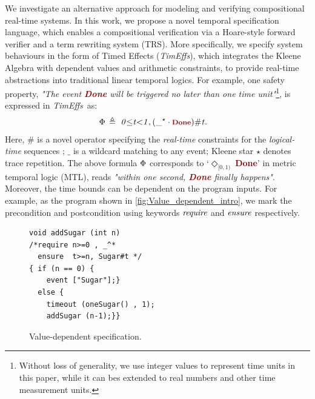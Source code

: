 \documentclass[acmsmall,10pt,review]{acmart}
\newcommand{\timedEffects}{\emph{TimEffs}}
\newcommand{\effect}{\textcolor{black}{\ensuremath{\mathrm{\Phi}}}}
\newcommand{\anyevent}[1]{{\textcolor{darkred}
{{\textbf{\footnotesize #1}}}}}
\newcommand{\code}[1]{{\tt{\ensuremath{\m{#1}}}}}
\newcommand{\m}{\mathit}
\def\defeq{\ensuremath{\,\triangleq}}
\begin{document}
We investigate an alternative approach for modeling and verifying 
compositional real-time systems. In this work, 
we propose a novel temporal specification language, 
which enables a compositional verification via a  Hoare-style 
forward verifier and a term rewriting system (TRS). 
More specifically, we specify system behaviours in the form of 
{Timed Effects} (\timedEffects), which integrates the Kleene Algebra with dependent values and arithmetic constraints, 
to 
provide real-time abstractions into traditional linear temporal logics. 
For example, one safety property, \textit{"The event \anyevent{Done} 
will be triggered no later than one time unit"}\footnote{Without loss of generality, 
we use integer values to represent time units in this 
paper, while it can bes extended to real numbers and other 
time measurement units.}, is expressed in \timedEffects\ as: 
\begin{align*}
&\code{\effect \defeq \  0 {\leq} t {<}1, ({\_^\star} \cdot \anyevent{Done} ) \# t}.
\end{align*}  
Here, \code{\#} is a novel operator specifying the \emph{real-time} 
constraints for the \emph{logical-time} sequences \cite{von2017real}; 
\code{\_} is a wildcard matching to any event; 
Kleene star \code{\star} denotes trace repetition.
The above formula \code{\effect} corresponds to `\code{\Diamond_{[0, 1)}\ }\anyevent{Done}' 
in metric temporal logic (MTL), reads \textit{"within one second, 
\anyevent{Done} finally happens"}. Moreover, the time bounds 
can be dependent on the program inputs. For example, as the program 
shown in \autoref{fig:Value_dependent_intro}, we mark the precondition and postcondition
using keywords \code{\emph{require}} and \code{\emph{ensure}} respectively. 

\newcommand{\codem}[1]{{\code{\emph{#1}}}}

\begin{figure}
  \vspace{-2mm}
\begin{lstlisting}
void addSugar (int n) 
/*require n>=0 , _^*
  ensure  t>=n, Sugar#t */
{ if (n == 0) { 
    event ["Sugar"];} 
  else {
    timeout (oneSugar() , 1);
    addSugar (n-1);}} 
\end{lstlisting}
\vspace{-1mm}
\caption{Value-dependent specification.} 
\label{fig:Value_dependent_intro}
\vspace{-1mm}
\end{figure}
\end{document}
